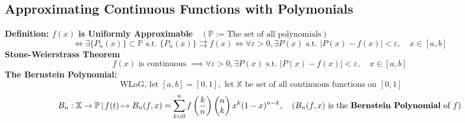 \documentclass{article}
\newcommand{\ucov}{\rightrightarrows}
\newcommand{\st}{\mbox{ s.t. }}
\newcommand{\wlg}{\mbox{ WLoG, let }}
\newcommand{\0}{{\bf{0}}}
\begin{document}
\subsection{Approximating Continuous Functions with Polymonials}
\textbf{Definition: $f(x)$ is Uniformly Approximable}$\quad(\mathbb{P}:= \mbox{The set of all polynomials})$ $$\iff\exists\{P_n(x)\}\subset\mathbb{P}\st\{P_n(x)\}\ucov f(x)\iff\forall\varepsilon>0,\exists P(x)\st|P(x)-f(x)|<\varepsilon,\quad x\in[a,b]$$
\textbf{Stone-Weierstrass Theorem}
$$f(x)\mbox{ is continuous }\implies\forall\varepsilon>0,\exists P(x)\st|P(x)-f(x)|<\varepsilon,\quad x\in[a,b]$$
\textbf{The Bernstein Polynomial:}
$$\wlg[a,b]=[0,1],\mbox{ let }\mathbb{X}\mbox{ be set of all continuous functions on }[0,1]$$
$$B_n:\mathbb{X}\to\mathbb{P}\,|\,f(t)\mapsto B_n(f,x)=\sum_{k=0}^nf\left(\frac{k}{n}\right)\begin{pmatrix}
n\\
k
\end{pmatrix}x^k(1-x)^{n-k},\quad(B_n(f,x)\mbox{ is the \textbf{Bernstein Polynomial} of }f)$$
\end{document}
